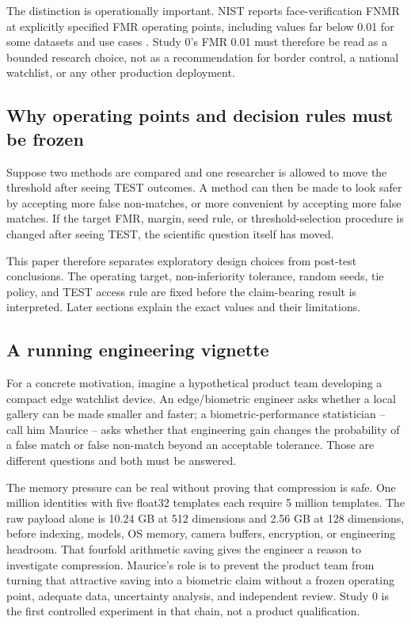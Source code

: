 \documentclass[10pt,a4paper]{article}
\begin{document}
The distinction is operationally important. NIST reports face-verification FNMR at explicitly
specified FMR operating points, including values far below 0.01 for some datasets and use
cases \cite{nistfrte11}. Study 0's FMR 0.01 must therefore be read as a bounded research
choice, not as a recommendation for border control, a national watchlist, or any other
production deployment.

\subsection{Why operating points and decision rules must be frozen}

Suppose two methods are compared and one researcher is allowed to move the threshold after
seeing TEST outcomes. A method can then be made to look safer by accepting more false
non-matches, or more convenient by accepting more false matches. If the target FMR, margin,
seed rule, or threshold-selection procedure is changed after seeing TEST, the scientific
question itself has moved.

This paper therefore separates exploratory design choices from post-test conclusions. The
operating target, non-inferiority tolerance, random seeds, tie policy, and TEST access rule
are fixed before the claim-bearing result is interpreted. Later sections explain the exact
values and their limitations.

\subsection{A running engineering vignette}

For a concrete motivation, imagine a hypothetical product team developing a compact edge
watchlist device. An edge/biometric engineer asks whether a local gallery can be made smaller
and faster; a biometric-performance statistician -- call him Maurice -- asks whether that
engineering gain changes the probability of a false match or false non-match beyond an
acceptable tolerance. Those are different questions and both must be answered.

The memory pressure can be real without proving that compression is safe. One million
identities with five float32 templates each require 5 million templates. The raw payload
alone is 10.24 GB at 512 dimensions and 2.56 GB at 128 dimensions, before indexing, models,
OS memory, camera buffers, encryption, or engineering headroom. That fourfold arithmetic
saving gives the engineer a reason to investigate compression. Maurice's role is to prevent
the product team from turning that attractive saving into a biometric claim without a
frozen operating point, adequate data, uncertainty analysis, and independent review. Study 0
is the first controlled experiment in that chain, not a product qualification.
\end{document}
